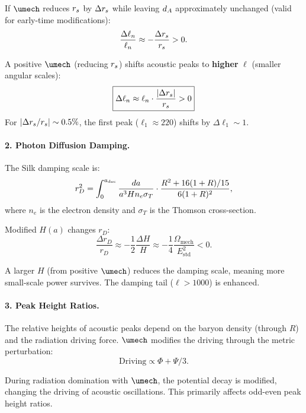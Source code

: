 If $\umech$ reduces $r_s$ by $\Delta r_s$ while leaving $d_A$ approximately unchanged (valid for early-time modifications):
\begin{equation}
\frac{\Delta\ell_n}{\ell_n} \approx -\frac{\Delta r_s}{r_s} > 0.
\end{equation}

\begin{proposition}
\label{prop:peak_shift}
A positive $\umech$ (reducing $r_s$) shifts acoustic peaks to \textbf{higher} $\ell$ (smaller angular scales):
\begin{equation}
\boxed{\Delta\ell_n \approx \ell_n \cdot \frac{|\Delta r_s|}{r_s} > 0}
\end{equation}
For $|\Delta r_s/r_s| \sim 0.5\%$, the first peak ($\ell_1 \approx 220$) shifts by $\Delta\ell_1 \sim 1$.
\end{proposition}

\paragraph{2. Photon Diffusion Damping.}
The Silk damping scale is:
\begin{equation}
r_D^2 = \int_0^{a_{\mathrm{dec}}} \frac{da}{a^3 H n_e \sigma_T} \cdot \frac{R^2 + 16(1+R)/15}{6(1+R)^2},
\end{equation}
where $n_e$ is the electron density and $\sigma_T$ is the Thomson cross-section.

Modified $H(a)$ changes $r_D$:
\begin{equation}
\frac{\Delta r_D}{r_D} \approx -\frac{1}{2}\frac{\Delta H}{H} \approx -\frac{1}{4}\frac{\Omega_{\mathrm{mech}}}{E_{\mathrm{std}}^2} < 0.
\end{equation}

A larger $H$ (from positive $\umech$) reduces the damping scale, meaning more small-scale power survives. The damping tail ($\ell > 1000$) is enhanced.

\paragraph{3. Peak Height Ratios.}
The relative heights of acoustic peaks depend on the baryon density (through $R$) and the radiation driving force. $\umech$ modifies the driving through the metric perturbation:
\begin{equation}
\text{Driving} \propto \Phi + \Psi/3.
\end{equation}

During radiation domination with $\umech$, the potential decay is modified, changing the driving of acoustic oscillations. This primarily affects odd-even peak height ratios.

